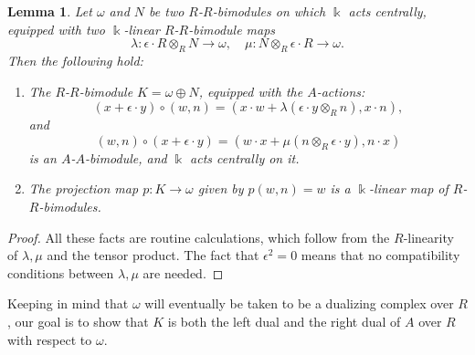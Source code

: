 \documentclass{amsart}
\newtheorem{lem}[equation]{Lemma}
\theoremstyle{definition}
\renewcommand{\k}{\Bbbk}
\numberwithin{equation}{section}
\begin{document}
\begin{lem}\label{lem:bimoduleK}
Let $\omega$ and $N$ be two $R$-$R$-bimodules on which $\k$ acts centrally,
equipped with two $\k$-linear $R$-$R$-bimodule maps
\[
\lambda : \epsilon\cdot R \otimes_R N \to \omega, \quad \mu:N\otimes_R \epsilon \cdot R \to \omega.
\]
Then the following hold:
\begin{enumerate}
\item The $R$-$R$-bimodule $K = \omega \oplus N$, equipped with the $A$-actions:
\[
(x+\epsilon \cdot y) \circ (w,n) = (x\cdot w + \lambda(\epsilon \cdot y\otimes_R n), x\cdot n),
\]
and 
\[
(w,n) \circ (x+\epsilon \cdot y) = (w \cdot x + \mu(n \otimes_R \epsilon \cdot y), n\cdot x)
\]
is an $A$-$A$-bimodule, and $\k$ acts centrally on it.
\item The projection map $p:K\to \omega$ given by $p(w,n) = w$ is a $\k$-linear map of $R$-$R$-bimodules.
\end{enumerate}
\end{lem}
\begin{proof}
All these facts are routine calculations,
which follow from the $R$-linearity of $\lambda, \mu$ and the tensor product.
The fact that $\epsilon^2 =0$ means that no compatibility conditions between $\lambda, \mu$ are needed.
\end{proof}

Keeping in mind that $\omega$ will eventually be taken to be a dualizing complex over $R$,
our goal is to show that $K$ is both the left dual and the right dual of $A$ over $R$ with respect to $\omega$.
\end{document}
